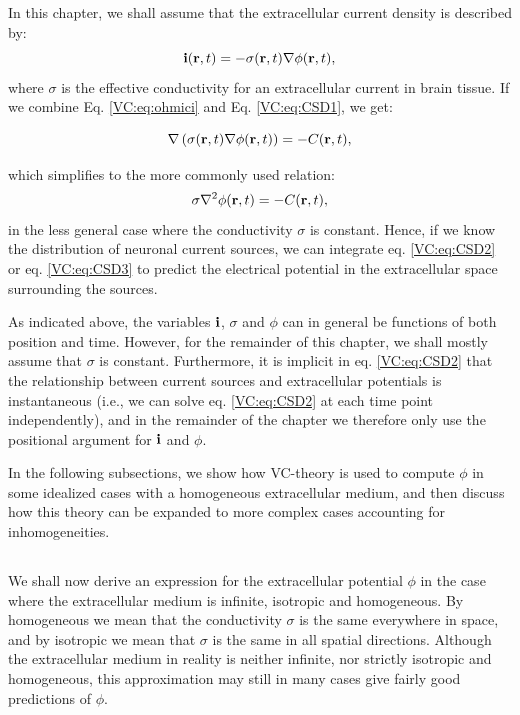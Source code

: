 In this chapter, we shall assume that the extracellular current density is described by:
\begin{equation}
{\bf i}({\bf r}, t) = - \sigma({\bf r}, t) \nabla \phi({\bf r}, t),
\label{VC:eq:ohmici}
\end{equation}
where $\sigma$ is the effective conductivity for an extracellular current in brain tissue. If we combine Eq. \ref{VC:eq:ohmici} and Eq. \ref{VC:eq:CSD1}, we get:

\begin{equation}
\nabla \left( \sigma({\bf r}, t) \nabla \phi({\bf r}, t) \right) = - C({\bf r}, t),
\label{VC:eq:CSD2}
\end{equation}

which simplifies to the more commonly used relation:
\begin{equation}
\sigma \nabla^2\phi({\bf r}, t) = - C({\bf r}, t),
\label{VC:eq:CSD3}
\end{equation}
in the less general case where the conductivity $\sigma$ is constant. Hence, if we know the distribution of neuronal current sources, we can integrate eq. \ref{VC:eq:CSD2} or eq. \ref{VC:eq:CSD3} to predict the electrical potential in the extracellular space surrounding the sources. 

As indicated above, the variables ${\bf i}$, $\sigma$ and $\phi$ can in general be functions of both position and time. However, for the remainder of this chapter, we shall mostly assume that $\sigma$ is constant. Furthermore, it is implicit in eq. \ref{VC:eq:CSD2} that the relationship between current sources and extracellular potentials is instantaneous (i.e., we can solve eq.  \ref{VC:eq:CSD2} at each time point independently), and in the remainder of the chapter we therefore only use the positional argument for ${\bf i}$ and $\phi$. 

In the following subsections, we show how VC-theory is used to compute $\phi$ in some idealized cases with a homogeneous extracellular medium, and then discuss how this theory can be expanded to more complex cases accounting for inhomogeneities. 


\subsection{}
\label{sec:VC:isohomo}

We shall now derive an expression for the extracellular potential $\phi$ in the case where the extracellular medium is infinite, isotropic and homogeneous. By homogeneous we mean that the conductivity $\sigma$ is the same everywhere in space, and by isotropic we mean that $\sigma$ is the same in all spatial directions. Although the extracellular medium in reality is neither infinite, nor strictly isotropic and homogeneous, this approximation may still in many cases give fairly good predictions of $\phi$.


